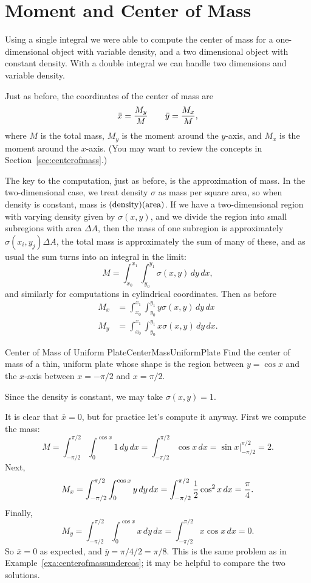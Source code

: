 \section{Moment and Center of Mass}\label{sec:MomentCenterMass}

Using a single integral we were able to compute the center of mass for
a one-dimensional object with variable density, and a two dimensional
object with constant density. With a double integral we can handle two
dimensions and variable density.

Just as before, the coordinates of the center of mass are
\[\bar x={M_y\over M} \qquad \bar y={M_x\over M},\]
where $M$ is the total mass, $M_y$ is the moment around the $y$-axis,
and $M_x$ is the moment around the $x$-axis. (You may want to review
the concepts in Section~\ref{sec:centerofmass}.)

The key to the computation, just as before, is the approximation of
mass. In the two-dimensional case, we treat density $\sigma$ as mass
per square area, so when density is constant, mass is 
$(\hbox{density})(\hbox{area})$. If we have a two-dimensional region
with varying density given by $\sigma(x,y)$, and we divide the region
into small subregions with area $\Delta A$, then the mass of one
subregion is approximately $\sigma(x_i,y_j)\Delta A$, the total mass
is approximately the sum of many of these, 
and as usual the sum
turns into an integral in the limit:
$$M=\int_{x_0}^{x_1}\int_{y_0}^{y_1} \sigma(x,y)\,dy\,dx,$$
and similarly for computations in cylindrical coordinates.
Then as before
\begin{align*}
M_x &= \int_{x_0}^{x_1}\int_{y_0}^{y_1} y\sigma(x,y)\,dy\,dx	\\
M_y &= \int_{x_0}^{x_1}\int_{y_0}^{y_1} x\sigma(x,y)\,dy\,dx.
\end{align*}

\begin{example}{Center of Mass of Uniform Plate}{CenterMassUniformPlate}
Find the center of mass of a thin, uniform plate whose shape
is the region between $y=\cos x$ and the $x$-axis between $x=-\pi/2$
and $x=\pi/2$.
\end{example}
\begin{solution}
Since the density is constant, we may take
$\sigma(x,y)=1$. 

It is clear that $\bar x=0$, but for practice let's
compute it anyway. First we compute the mass:
\[
M=\int_{-\pi/2}^{\pi/2} \int_0^{\cos x} 1\,dy\,dx
=\int_{-\pi/2}^{\pi/2} \cos x\,dx
=\left.\sin x\right|_{-\pi/2}^{\pi/2}=2.
\]
Next,
\[
M_x=\int_{-\pi/2}^{\pi/2} \int_0^{\cos x} y\,dy\,dx
=\int_{-\pi/2}^{\pi/2} {1\over2}\cos^2 x\,dx={\pi\over4}.
\]
Finally,
\[
M_y=\int_{-\pi/2}^{\pi/2} \int_0^{\cos x} x\,dy\,dx
=\int_{-\pi/2}^{\pi/2} x\cos x\,dx=0.
\]
So $\bar x=0$ as expected, and $\bar y=\pi/4/2=\pi/8$. 
This is the same problem as in Example~\ref{exa:centerofmassundercos};
it may be helpful to compare the two solutions.
\end{solution}

